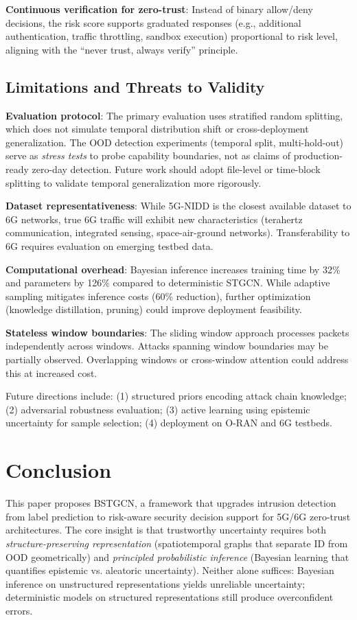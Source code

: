 \documentclass[lettersize,journal]{IEEEtran}
\begin{document}
\textbf{Continuous verification for zero-trust}: Instead of binary allow/deny decisions, the risk score supports graduated responses (e.g., additional authentication, traffic throttling, sandbox execution) proportional to risk level, aligning with the ``never trust, always verify'' principle.

\subsection{Limitations and Threats to Validity}

\textbf{Evaluation protocol}: The primary evaluation uses stratified random splitting, which does not simulate temporal distribution shift or cross-deployment generalization. The OOD detection experiments (temporal split, multi-hold-out) serve as \textit{stress tests} to probe capability boundaries, not as claims of production-ready zero-day detection. Future work should adopt file-level or time-block splitting to validate temporal generalization more rigorously.

\textbf{Dataset representativeness}: While 5G-NIDD is the closest available dataset to 6G networks, true 6G traffic will exhibit new characteristics (terahertz communication, integrated sensing, space-air-ground networks). Transferability to 6G requires evaluation on emerging testbed data.

\textbf{Computational overhead}: Bayesian inference increases training time by 32\% and parameters by 126\% compared to deterministic STGCN. While adaptive sampling mitigates inference costs (60\% reduction), further optimization (knowledge distillation, pruning) could improve deployment feasibility.

\textbf{Stateless window boundaries}: The sliding window approach processes packets independently across windows. Attacks spanning window boundaries may be partially observed. Overlapping windows or cross-window attention could address this at increased cost.

Future directions include: (1) structured priors encoding attack chain knowledge; (2) adversarial robustness evaluation; (3) active learning using epistemic uncertainty for sample selection; (4) deployment on O-RAN and 6G testbeds.

\section{Conclusion}

This paper proposes BSTGCN, a framework that upgrades intrusion detection from label prediction to risk-aware security decision support for 5G/6G zero-trust architectures. The core insight is that trustworthy uncertainty requires both \textit{structure-preserving representation} (spatiotemporal graphs that separate ID from OOD geometrically) and \textit{principled probabilistic inference} (Bayesian learning that quantifies epistemic vs. aleatoric uncertainty). Neither alone suffices: Bayesian inference on unstructured representations yields unreliable uncertainty; deterministic models on structured representations still produce overconfident errors.
\end{document}
